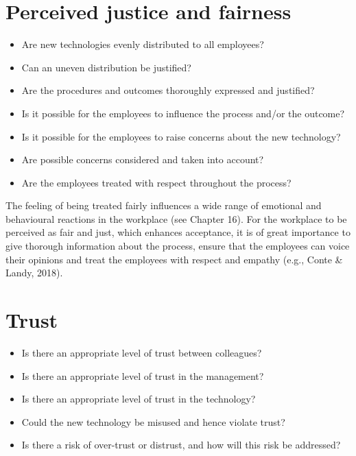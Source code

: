 \documentclass[
  12pt,
]{scrbook}
\begin{document}
\hypertarget{perceived-justice-and-fairness}{%
\section*{Perceived justice and fairness}\label{perceived-justice-and-fairness}}

\begin{itemize}
\item
  Are new technologies evenly distributed to all employees?
\item
  Can an uneven distribution be justified?
\item
  Are the procedures and outcomes thoroughly expressed and justified?
\item
  Is it possible for the employees to influence the process and/or the outcome?
\item
  Is it possible for the employees to raise concerns about the new technology?
\item
  Are possible concerns considered and taken into account?~
\item
  Are the employees treated with respect throughout the process?
\end{itemize}

The feeling of being treated fairly influences a wide range of emotional and behavioural reactions in the workplace (see Chapter 16). For the workplace to be perceived as fair and just, which enhances acceptance, it is of great importance to give thorough information about the process, ensure that the employees can voice their opinions and treat the employees with respect and empathy (e.g., Conte \& Landy, 2018).

\hypertarget{trust-1}{%
\section*{Trust}\label{trust-1}}

\begin{itemize}
\item
  Is there an appropriate level of trust between colleagues?
\item
  Is there an appropriate level of trust in the management?
\item
  Is there an appropriate level of trust in the technology?
\item
  Could the new technology be misused and hence violate trust?
\item
  Is there a risk of over-trust or distrust, and how will this risk be addressed?
\end{itemize}
\end{document}
